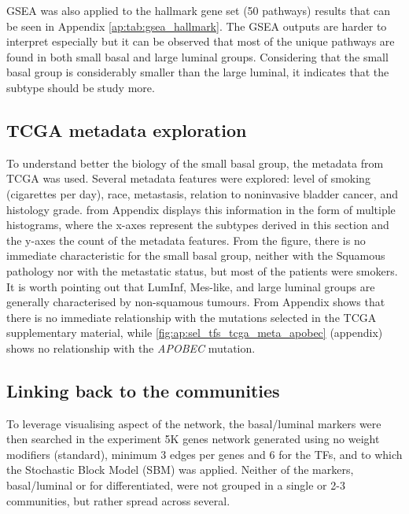 GSEA was also applied to the hallmark gene set (50 pathways) results that can be seen in Appendix \cref{ap:tab:gsea_hallmark}. The GSEA outputs are harder to interpret especially but it can be observed that most of the unique pathways are found in both small basal and large luminal groups. Considering that the small basal group is considerably smaller than the large luminal, it indicates that the subtype should be study more.

\subsection{TCGA metadata exploration} \label{s:N_I:sel_tfs_metadata}

To understand better the biology of the small basal group, the metadata from TCGA \citet{Robertson2017-mg} was used. Several metadata features were explored: level of smoking (cigarettes per day), race, metastasis, relation to noninvasive bladder cancer, and histology grade.  from Appendix displays this information in the form of multiple histograms, where the x-axes represent the subtypes derived in this section and the y-axes the count of the metadata features. From the figure, there is no immediate characteristic for the small basal group, neither with the Squamous pathology nor with the metastatic status, but most of the patients were smokers. It is worth pointing out that LumInf, Mes-like, and large luminal groups are generally characterised by non-squamous tumours. From Appendix  shows that there is no immediate relationship with the mutations selected in the TCGA supplementary material, while \cref{fig:ap:sel_tfs_tcga_meta_apobec} (appendix) shows no relationship with the \textit{APOBEC} mutation.


\subsection{Linking back to the communities} \label{s:N_I:sel_tfs_net}

To leverage visualising aspect of the network, the basal/luminal markers were then searched in the experiment 5K genes network generated using no weight modifiers (standard), minimum 3 edges per genes and 6 for the TFs, and to which the Stochastic Block Model (SBM) was applied. Neither of the markers, basal/luminal or for differentiated, were not grouped in a single or 2-3 communities, but rather spread across several.


